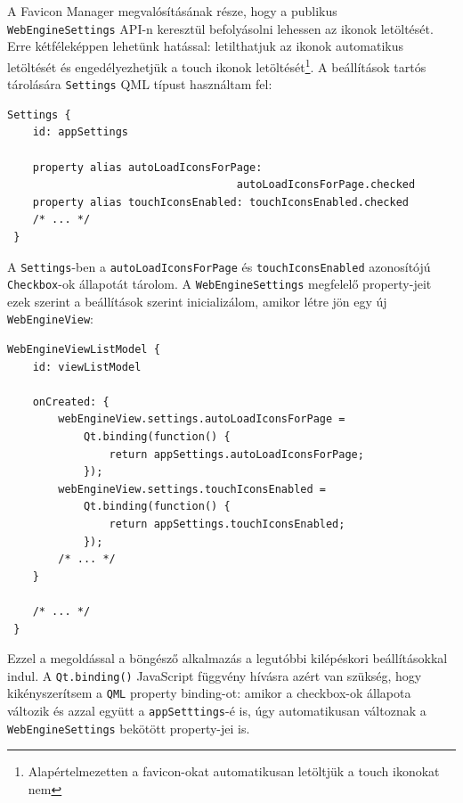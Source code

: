 \documentclass[12pt]{report}
\begin{document}
A Favicon Manager megvalósításának része, hogy a publikus \\
\texttt{WebEngineSettings}
API-n keresztül befolyásolni lehessen az ikonok letöltését. Erre kétféleképpen lehetünk
hatással: letilthatjuk az ikonok automatikus letöltését és engedélyezhetjük a touch
ikonok letöltését\footnote{Alapértelmezetten a favicon-okat automatikusan letöltjük a touch
ikonokat nem}. A beállítások tartós tárolására \texttt{Settings} QML típust használtam fel:
\begin{lstlisting}[title=main.qml]
 Settings {
    id: appSettings

    property alias autoLoadIconsForPage:
                                    autoLoadIconsForPage.checked
    property alias touchIconsEnabled: touchIconsEnabled.checked
    /* ... */
 }
\end{lstlisting}
A \texttt{Settings}-ben a \texttt{autoLoadIconsForPage} és \texttt{touchIconsEnabled}
azonosítójú \texttt{Checkbox}-ok állapotát tárolom. A \texttt{WebEngineSettings} megfelelő
property-jeit ezek szerint a beállítások szerint inicializálom, amikor létre jön egy új \\
\texttt{WebEngineView}:
\begin{lstlisting}[title=main.qml]
 WebEngineViewListModel {
    id: viewListModel

    onCreated: {
        webEngineView.settings.autoLoadIconsForPage =
            Qt.binding(function() {
                return appSettings.autoLoadIconsForPage;
            });
        webEngineView.settings.touchIconsEnabled =
            Qt.binding(function() {
                return appSettings.touchIconsEnabled;
            });
        /* ... */
    }

    /* ... */
 }
\end{lstlisting}
Ezzel a megoldással a böngésző alkalmazás a legutóbbi kilépéskori beállításokkal indul. A
\texttt{Qt.binding()} JavaScript függvény hívásra azért van szükség, hogy kikényszerítsem
a \texttt{QML} property binding-ot: amikor a checkbox-ok állapota változik és azzal együtt
a \texttt{appSetttings}-é is, úgy automatikusan változnak a \texttt{WebEngineSettings}
bekötött property-jei is.
\end{document}
